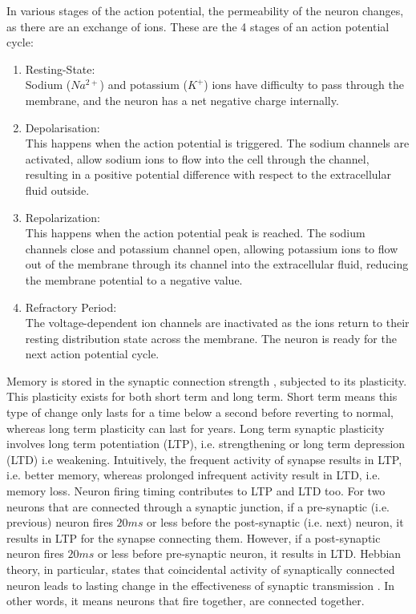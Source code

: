 In various stages of the action potential, the permeability of the neuron changes, as there are an exchange of ions. These are the 4 stages of an action potential cycle:
\begin{enumerate}
	\item Resting-State:\\
	Sodium ($Na^{2+}$) and potassium ($K^+$) ions have difficulty to pass through the membrane, and the neuron has a net negative charge internally.
	\item Depolarisation:\\
	This happens when the action potential is triggered. The sodium channels are activated, allow sodium ions to flow into the cell through the channel, resulting in a positive potential difference with respect to the extracellular fluid outside.
	\item Repolarization:\\
	This happens when the action potential peak is reached. The sodium channels close and potassium channel open, allowing potassium ions to flow out of the membrane through its channel into the extracellular fluid, reducing the membrane potential to a negative value.
	\item Refractory Period:\\
	The voltage-dependent ion channels are inactivated as the ions return to their resting distribution state across the membrane. The neuron is ready for the next action potential cycle.
\end{enumerate}
Memory is stored in the synaptic connection strength \cite{learnnmemory}, subjected to its plasticity. This plasticity exists for both short term and long term. Short term means this type of change only lasts for a time below a second before reverting to normal, whereas long term plasticity can last for years. Long term synaptic plasticity involves long term potentiation (LTP), i.e. strengthening or long term depression (LTD) i.e weakening. Intuitively, the frequent activity of synapse results in LTP, i.e. better memory, whereas prolonged infrequent activity result in LTD, i.e. memory loss. Neuron firing timing contributes to LTP and LTD too. For two neurons that are connected through a synaptic junction, if a pre-synaptic (i.e. previous) neuron fires $20ms$ or less before the post-synaptic (i.e. next) neuron, it results in LTP for the synapse connecting them. However, if a post-synaptic neuron fires $20ms$ or less before pre-synaptic neuron, it results in LTD. Hebbian theory, in particular, states that coincidental activity of synaptically connected neuron leads to lasting change in the effectiveness of synaptic transmission \cite{hebb}. In other words, it means neurons that fire together, are connected together.
